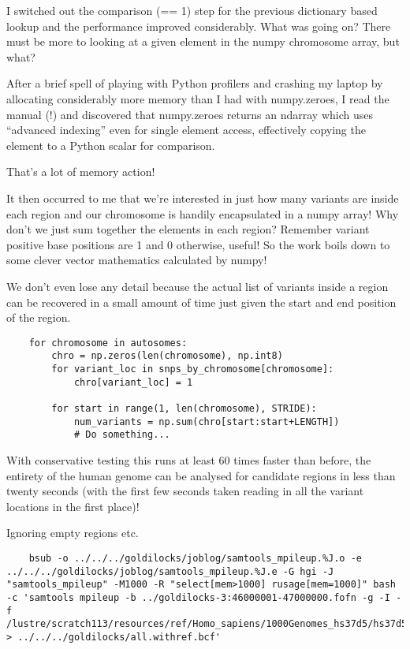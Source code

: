 I switched out the comparison (== 1) step for the previous dictionary based
lookup and the performance improved considerably. What was going on? There must
be more to looking at a given element in the numpy chromosome array, but what?

After a brief spell of playing with Python profilers and crashing my laptop by
allocating considerably more memory than I had with numpy.zeroes, I read the
manual (!) and discovered that numpy.zeroes returns an ndarray which uses
“advanced indexing” even for single element access, effectively copying the
element to a Python scalar for comparison.

That’s a lot of memory action!

It then occurred to me that we’re interested in just how many variants are
inside each region and our chromosome is handily encapsulated in a numpy array!
Why don’t we just sum together the elements in each region? Remember variant
positive base positions are 1 and 0 otherwise, useful! So the work boils down
to some clever vector mathematics calculated by numpy!

We don’t even lose any detail because the actual list of variants inside a
region can be recovered in a small amount of time just given the start and end
position of the region.

\begin{verbatim}
    for chromosome in autosomes:
        chro = np.zeros(len(chromosome), np.int8)
        for variant_loc in snps_by_chromosome[chromosome]:
            chro[variant_loc] = 1

        for start in range(1, len(chromosome), STRIDE):
            num_variants = np.sum(chro[start:start+LENGTH])
            # Do something...
\end{verbatim}

With conservative testing this runs at least 60 times faster than before, the
entirety of the human genome can be analysed for candidate regions in less than
twenty seconds (with the first few seconds taken reading in all the variant
locations in the first place)!

Ignoring empty regions etc.

\begin{verbatim}
    bsub -o ../../../goldilocks/joblog/samtools_mpileup.%J.o -e ../../../goldilocks/joblog/samtools_mpileup.%J.e -G hgi -J "samtools_mpileup" -M1000 -R "select[mem>1000] rusage[mem=1000]" bash -c 'samtools mpileup -b ../goldilocks-3:46000001-47000000.fofn -g -I -f /lustre/scratch113/resources/ref/Homo_sapiens/1000Genomes_hs37d5/hs37d5.fa > ../../../goldilocks/all.withref.bcf'
\end{verbatim}


